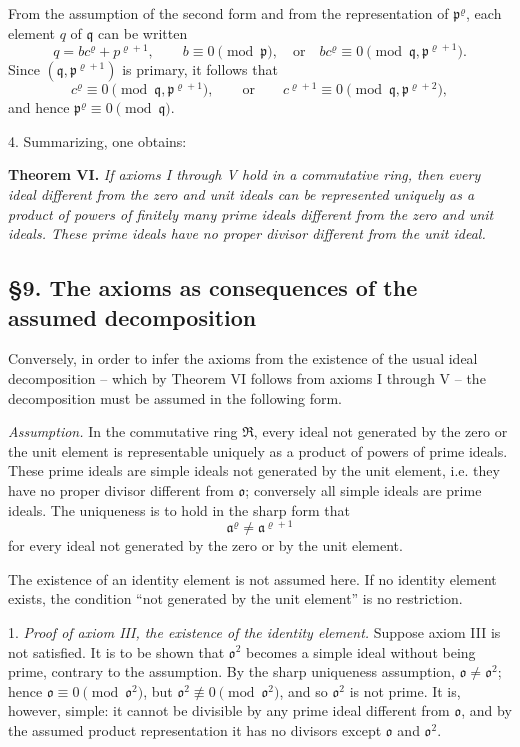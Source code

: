 \documentclass[11pt]{article}
\providecommand{\mR}{\mathfrak{R}}
\providecommand{\ma}{\mathfrak{a}}
\providecommand{\mo}{\mathfrak{o}}
\providecommand{\mpideal}{\mathfrak{p}}
\providecommand{\mq}{\mathfrak{q}}
\begin{document}
From the assumption of the second form and from the representation of $\mpideal^\varrho$, each element $q$ of $\mq$ can be written
\[
        q=b c^\varrho+p^{\varrho+1},
        \qquad b\equiv0\pmod{\mpideal},
        \quad\text{or}\quad b c^\varrho\equiv0\pmod{\mq,\mpideal^{\varrho+1}}.
\]
Since $(\mq,\mpideal^{\varrho+1})$ is primary, it follows that
\[
        c^\varrho\equiv0\pmod{\mq,\mpideal^{\varrho+1}},
        \qquad\text{or}\qquad
        c^{\varrho+1}\equiv0\pmod{\mq,\mpideal^{\varrho+2}},
\]
and hence $\mpideal^\varrho\equiv0\pmod{\mq}$.

4. Summarizing, one obtains:

\textbf{Theorem VI.} \emph{If axioms I through V hold in a commutative ring, then every ideal different from the zero and unit ideals can be represented uniquely as a product of powers of finitely many prime ideals different from the zero and unit ideals. These prime ideals have no proper divisor different from the unit ideal.}

\subsection*{§9. The axioms as consequences of the assumed decomposition}

Conversely, in order to infer the axioms from the existence of the usual ideal decomposition -- which by Theorem VI follows from axioms I through V -- the decomposition must be assumed in the following form.

\emph{Assumption.} In the commutative ring $\mR$, every ideal not generated by the zero or the unit element is representable uniquely as a product of powers of prime ideals. These prime ideals are simple ideals not generated by the unit element, i.e. they have no proper divisor different from $\mo$; conversely all simple ideals are prime ideals. The uniqueness is to hold in the sharp form that
\[
        \ma^\varrho\ne\ma^{\varrho+1}
\]
for every ideal not generated by the zero or by the unit element.

The existence of an identity element is not assumed here. If no identity element exists, the condition ``not generated by the unit element'' is no restriction.

1. \emph{Proof of axiom III, the existence of the identity element.} Suppose axiom III is not satisfied. It is to be shown that $\mo^2$ becomes a simple ideal without being prime, contrary to the assumption. By the sharp uniqueness assumption, $\mo\ne\mo^2$; hence $\mo\equiv0\pmod{\mo^2}$, but $\mo^2\not\equiv0\pmod{\mo^2}$, and so $\mo^2$ is not prime. It is, however, simple: it cannot be divisible by any prime ideal different from $\mo$, and by the assumed product representation it has no divisors except $\mo$ and $\mo^2$.
\end{document}
